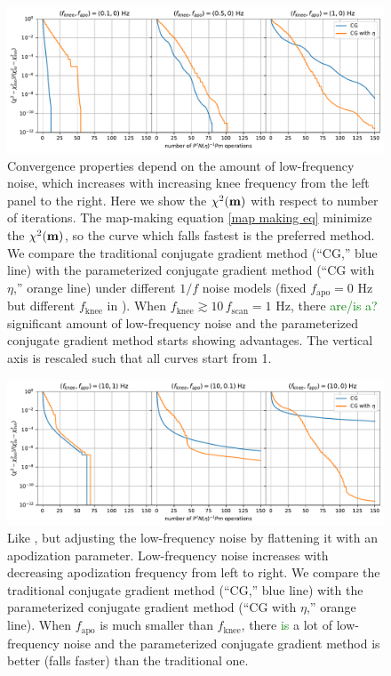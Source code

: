 \documentclass[twocolumn,linenumbers]{aastex631}
\newcommand{\Eq}[1]{\text{Eq.\,\ref{#1}}}
\newcommand{\Figure}[1]{\text{Figure\,\ref{#1}}}
\newcommand{\vbm}{\vb{m}}
\newcommand{\textgreen}[1]{\textcolor{green}{#1}}
\begin{document}
\begin{figure}[tb!]
\centering
\includegraphics[width=\textwidth]{pink_noise_chi2.pdf}
\caption{
    Convergence properties depend on the amount of low-frequency noise,
    which increases with increasing knee frequency from the left panel to the right.
    Here we show the $\chi^2(\vbm)$ with respect to number of iterations. 
    The map-making equation \ref{map making eq} minimize the $\chi^2(\vbm)$, so
    the curve which falls fastest is the preferred method.
    We compare the traditional conjugate gradient method (``{CG},'' blue line)
    with the parameterized conjugate gradient method (``{CG with $\eta$},'' orange line)
    under different $1/f$ noise models (fixed $f_\text{apo}=0$ Hz but different $f_\text{knee}$ in \Eq{noise power spectrum}).
    When $f_\text{knee} \gtrsim 10\,f_\text{scan} = 1$ Hz, there \textgreen{are/is a?} significant amount of
    low-frequency noise and the parameterized conjugate gradient method starts showing advantages.  The vertical axis is rescaled  such that all curves start from 1.
}
\label{1/f noise chi2}
\end{figure}

\begin{figure}[tb!]
\centering
\includegraphics[width=\textwidth]{flattened_noise_chi2.pdf}
\caption{Like \Figure{1/f noise chi2}, but adjusting the low-frequency noise by flattening it with an apodization parameter.
    Low-frequency noise increases with decreasing apodization frequency from left to right.
    We compare the traditional conjugate gradient method (``{CG},'' blue line) 
    with the parameterized conjugate gradient method (``{CG with $\eta$},'' orange line).
    When $f_\text{apo}$ is much smaller than $f_\text{knee}$, there \textgreen{is} a lot of low-frequency noise and
    the parameterized conjugate gradient method is better (falls faster) than the traditional one.
}
\label{apo noise chi2}
\end{figure}
\end{document}

